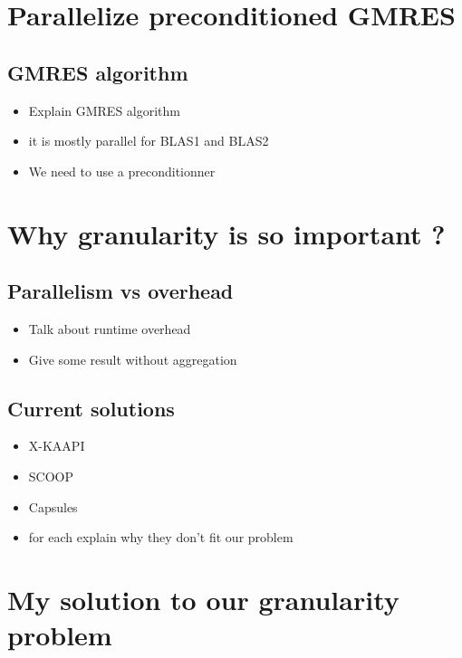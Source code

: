 \documentclass[oneside,12t]{classes/Thesis}
\begin{document}
\section{Parallelize preconditioned GMRES}
\subsection{GMRES algorithm}
  \begin{itemize}
    \item Explain GMRES algorithm
    \item it is mostly parallel for BLAS1 and BLAS2
    \item We need to use a preconditionner
  \end{itemize}


\section{Why granularity is so important ?}
\subsection{Parallelism vs overhead}
  \begin{itemize}
    \item Talk about runtime overhead
    \item Give some result without aggregation
  \end{itemize}
\subsection{Current solutions}
  \begin{itemize}
    \item X-KAAPI
    \item SCOOP
    \item Capsules
    \item for each explain why they don't fit our problem
  \end{itemize}


\section{My solution to our granularity problem}
\end{document}
